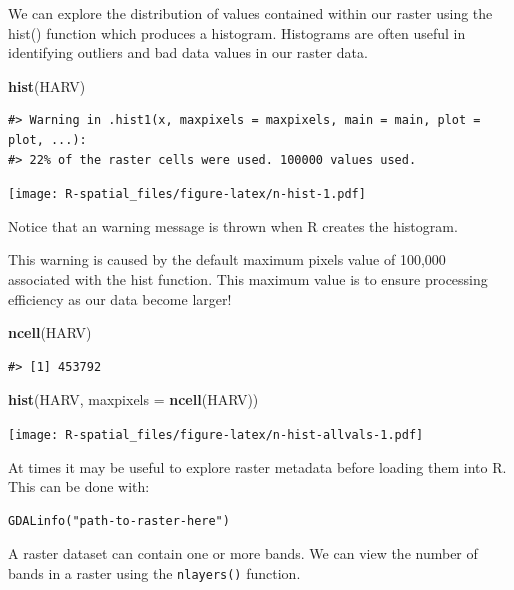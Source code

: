 \documentclass[]{book}
\newenvironment{Shaded}{\begin{snugshade}}{\end{snugshade}}
\newcommand{\KeywordTok}[1]{\textcolor[rgb]{0.13,0.29,0.53}{\textbf{#1}}}
\newcommand{\DataTypeTok}[1]{\textcolor[rgb]{0.13,0.29,0.53}{#1}}
\newcommand{\NormalTok}[1]{#1}
\theoremstyle{definition}
\theoremstyle{definition}
\theoremstyle{definition}
\theoremstyle{remark}
\begin{document}
We can explore the distribution of values contained within our raster
using the hist() function which produces a histogram. Histograms are
often useful in identifying outliers and bad data values in our raster
data.

\begin{Shaded}
\begin{Highlighting}[]
\KeywordTok{hist}\NormalTok{(HARV)}
\end{Highlighting}
\end{Shaded}

\begin{verbatim}
#> Warning in .hist1(x, maxpixels = maxpixels, main = main, plot = plot, ...):
#> 22% of the raster cells were used. 100000 values used.
\end{verbatim}

\texttt{[image: R-spatial\_files/figure-latex/n-hist-1.pdf]}

Notice that an warning message is thrown when R creates the histogram.

This warning is caused by the default maximum pixels value of 100,000
associated with the hist function. This maximum value is to ensure
processing efficiency as our data become larger!

\begin{Shaded}
\begin{Highlighting}[]
\KeywordTok{ncell}\NormalTok{(HARV)}
\end{Highlighting}
\end{Shaded}

\begin{verbatim}
#> [1] 453792
\end{verbatim}

\begin{Shaded}
\begin{Highlighting}[]
\KeywordTok{hist}\NormalTok{(HARV,}
     \DataTypeTok{maxpixels =} \KeywordTok{ncell}\NormalTok{(HARV))}
\end{Highlighting}
\end{Shaded}

\texttt{[image: R-spatial\_files/figure-latex/n-hist-allvals-1.pdf]}

At times it may be useful to explore raster metadata before loading them
into R. This can be done with:

\begin{verbatim}
GDALinfo("path-to-raster-here") 
\end{verbatim}

A raster dataset can contain one or more bands. We can view the number
of bands in a raster using the \texttt{nlayers()} function.
\end{document}
